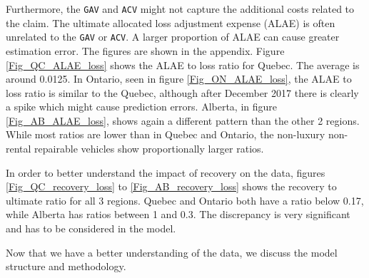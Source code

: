 	Furthermore, the \texttt{GAV} and \texttt{ACV} might not capture the additional costs related to the claim. The ultimate allocated loss adjustment expense (ALAE) is often unrelated to the \texttt{GAV} or \texttt{ACV}. A larger proportion of ALAE can cause greater estimation error. The figures are shown in the appendix. Figure \ref{Fig_QC_ALAE_loss} shows the ALAE to loss ratio for Quebec. The average is around 0.0125. In Ontario, seen in figure \ref{Fig_ON_ALAE_loss}, the ALAE to loss ratio is similar to the Quebec, although after December 2017 there is clearly a spike which might cause prediction errors. Alberta, in figure \ref{Fig_AB_ALAE_loss}, shows again a different pattern than the other 2 regions. While most ratios are lower than in Quebec and Ontario, the non-luxury non-rental repairable vehicles show proportionally larger ratios.
	
	In order to better understand the impact of recovery on the data, figures \ref{Fig_QC_recovery_loss} to \ref{Fig_AB_recovery_loss} shows the recovery to ultimate ratio for all 3 regions. Quebec and Ontario both have a ratio below 0.17, while Alberta has ratios between 1 and 0.3. The discrepancy is very significant and has to be considered in the model.

	Now that we have a better understanding of the data, we discuss the model structure and methodology.
	
	 